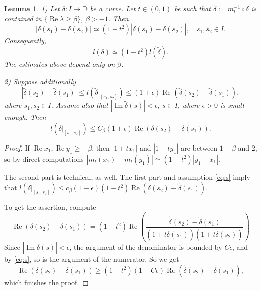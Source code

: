 \documentclass[10pt,a4paper]{amsart}
\newtheorem{lemma}{Lemma}
\newcommand\DD{{\mathbb D}}
\def\im{\operatorname{Im}}
\def\re{\operatorname{Re}}
\begin{document}
\begin{lemma}\label{lem:mt} 1) Let $\delta:I\to \DD$ be a curve. Let $t\in (0,1)$  be such that $\tilde \delta:=m_t^{-1}\circ \delta $ is contained in $\{\re \lambda \geq \beta\}$, $\beta>-1$. Then 
$$| \delta(s_1) - \delta(s_2)|\simeq (1-t^2) |\tilde \delta (s_1) - \tilde \delta(s_2)|,\quad s_1,s_2\in I.$$ 
Consequently, 
$$l(\delta)\simeq (1-t^2) l(\tilde \delta).$$ 
The estimates above depend only on $\beta$.

2) Suppose additionally
\begin{equation}\label{eq:s}
\left| \tilde\delta(s_2) - \tilde\delta(s_1)\right| \le 
l(\tilde \delta |_{[s_1,s_2]} )\leq (1+ \epsilon) \re(\tilde\delta(s_2) - \tilde\delta(s_1)),
\end{equation} 
where $s_1, s_2\in I$.
Assume also that $|\im \tilde \delta(s)|<\epsilon$, $s\in I$,  where $\epsilon>0$ is small enough. Then $$l(\delta|_{[s_1,s_2]}) \leq  C_{\beta} (1+ \epsilon) \re (\delta(s_2) - \delta(s_1)).$$ 
\end{lemma}

\begin{proof}
If $\re x_1, \re y_1\geq -\beta$, then $|1+t x_1|$ and $|1+t y_1|$ are between $1-\beta$ and 2, so by direct computations $|m_t(x_1) -m_t(y_1)|\simeq  (1-t^2)|y_1-x_1|$.

The second part is technical, as well. The first part
and assumption \eqref{eq:s} imply that $l(\delta|_{[s_1, s_2]}) \leq c_\beta (1+\epsilon) (1-t^2) \re (\tilde\delta (s_2) - \tilde \delta (s_1)).$

To get the assertion, compute
\[ 
\re (\delta(s_2) - \delta(s_1)) = (1-t^2) 
\re \left(     
\frac{\tilde\delta(s_2) - \tilde\delta(s_1)}{(1+t\tilde\delta(s_1)) (1+t\tilde\delta(s_2))} \right)
\]
Since $|\im \tilde \delta(s)|<\epsilon$, the argument of the 
denominator is bounded by $C\epsilon$, and by \eqref{eq:s}, so is
the argument of the numerator. So we get
\[
\re (\delta(s_2) - \delta(s_1)) \geq
(1-t^2)(1-C\epsilon)\re \left( \tilde\delta(s_2) - \tilde\delta(s_1)\right),
\]
which finishes the proof.
\end{proof}
\end{document}
